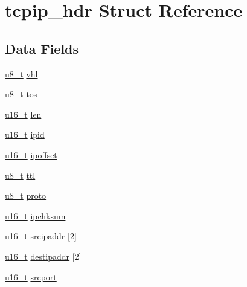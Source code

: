 \hypertarget{structtcpip__hdr}{
\section{tcpip\_\-hdr Struct Reference}
\label{structtcpip__hdr}
}
\subsection*{Data Fields}
\begin{DoxyCompactItemize}
\item 
\hyperlink{group__uipfw_ga4caecabca98b43919dd11be1c0d4cd8e}{u8\_\-t} \hyperlink{structtcpip__hdr_a24ef3e6d22964f5770a7a6afb1a5b5e5}{vhl}
\item 
\hyperlink{group__uipfw_ga4caecabca98b43919dd11be1c0d4cd8e}{u8\_\-t} \hyperlink{structtcpip__hdr_a37562b2acca6ce3fb04923755968ae0c}{tos}
\item 
\hyperlink{group__uipfw_ga77570ac4fcab86864fa1916e55676da2}{u16\_\-t} \hyperlink{group__uipfw_ga79d2ddae647ea9bfd665465b1c703f46}{len}
\item 
\hyperlink{group__uipfw_ga77570ac4fcab86864fa1916e55676da2}{u16\_\-t} \hyperlink{group__uipfw_ga64fde6733614e762febfa222d41997a5}{ipid}
\item 
\hyperlink{group__uipfw_ga77570ac4fcab86864fa1916e55676da2}{u16\_\-t} \hyperlink{group__uipfw_ga6d792a078604a9fdef0145b296233661}{ipoffset}
\item 
\hyperlink{group__uipfw_ga4caecabca98b43919dd11be1c0d4cd8e}{u8\_\-t} \hyperlink{group__uipfw_ga23148b00701b22ff693cad8f42e09efb}{ttl}
\item 
\hyperlink{group__uipfw_ga4caecabca98b43919dd11be1c0d4cd8e}{u8\_\-t} \hyperlink{group__uipfw_gabf0603fa00a2effd2f79d8b3f36e9fb1}{proto}
\item 
\hyperlink{group__uipfw_ga77570ac4fcab86864fa1916e55676da2}{u16\_\-t} \hyperlink{group__uipfw_gac9d7e009428b082b42289b22bc297085}{ipchksum}
\item 
\hyperlink{group__uipfw_ga77570ac4fcab86864fa1916e55676da2}{u16\_\-t} \hyperlink{group__uipfw_gae7234666e63801b5d3b76853d4f8c3da}{srcipaddr} \mbox{[}2\mbox{]}
\item 
\hyperlink{group__uipfw_ga77570ac4fcab86864fa1916e55676da2}{u16\_\-t} \hyperlink{group__uipfw_gaec3775d18acd7ecc7bb0fbe6f7987c43}{destipaddr} \mbox{[}2\mbox{]}
\item 
\hyperlink{group__uipfw_ga77570ac4fcab86864fa1916e55676da2}{u16\_\-t} \hyperlink{group__uipfw_ga410b213756b5374d6ce2024c2e43cbf8}{srcport}

\end{DoxyCompactItemize}
